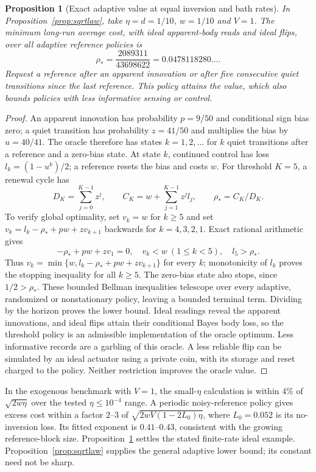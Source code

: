 \documentclass[12pt]{article}
\newtheorem{proposition}[theorem]{Proposition}
\theoremstyle{definition}
\begin{document}
\begin{proposition}[Exact adaptive value at equal inversion and bath rates]
\label{prop:adaptive_exact}
In Proposition~\ref{prop:sqrtlaw}, take $\eta=d=1/10$, $w=1/10$ and $V=1$.
The minimum long-run average cost, with ideal apparent-body reads and ideal
flips, over all adaptive reference policies is
\[
 \rho_* = \frac{2089311}{43698622}=0.0478118280\ldots.
\]
Request a reference after an apparent innovation or after five consecutive
quiet transitions since the last reference. This policy attains the value,
which also bounds policies with less informative sensing or control.
\end{proposition}
\begin{proof}
An apparent innovation has probability $p=9/50$ and conditional sign bias
zero; a quiet transition has probability $z=41/50$ and multiplies the bias
by $u=40/41$. The oracle therefore has states $k=1,2,\ldots$ for $k$ quiet
transitions after a reference and a zero-bias state. At state $k$, continued
control has loss $l_k=(1-u^k)/2$; a reference resets the bias and costs $w$.
For threshold $K=5$, a renewal cycle has
\[
 D_K=\sum_{j=0}^{K-1}z^j,\qquad
 C_K=w+\sum_{j=1}^{K-1}z^jl_j,\qquad \rho_*=C_K/D_K.
\]
To verify global optimality, set $v_k=w$ for $k\ge5$ and set
$v_k=l_k-\rho_*+pw+zv_{k+1}$ backwards for $k=4,3,2,1$.
Exact rational arithmetic gives
\[
 -\rho_*+pw+zv_1=0,\quad v_k<w\ (1\le k<5),\quad l_5>\rho_*.
\]
Thus $v_k=\min\{w,l_k-\rho_*+pw+zv_{k+1}\}$ for every $k$;
monotonicity of $l_k$ proves the stopping inequality for all $k\ge5$.
The zero-bias state also stops, since $1/2>\rho_*$. These bounded Bellman
inequalities telescope over every adaptive, randomized or nonstationary
policy, leaving a bounded terminal term. Dividing by the horizon proves
the lower bound. Ideal readings reveal the apparent innovations, and ideal
flips attain their conditional Bayes body loss, so the threshold policy is
an admissible implementation of the oracle optimum. Less informative
records are a garbling of this oracle. A less reliable flip can be
simulated by an ideal actuator using a private coin, with its storage
and reset charged to the policy. Neither restriction improves the
oracle value.
\end{proof}

In the exogenous benchmark with $V=1$, the small-$\eta$ calculation is within $4\%$ of $\sqrt{2w\eta}$ over the tested $\eta\le10^{-4}$ range. A periodic noisy-reference policy gives excess cost within a factor $2$--$3$ of $\sqrt{2wV(1-2L_0)\eta}$, where $L_0=0.052$ is its no-inversion loss. Its fitted exponent is $0.41$--$0.43$, consistent with the growing reference-block size. Proposition~\ref{prop:adaptive_exact} settles the stated finite-rate ideal example. Proposition~\ref{prop:sqrtlaw} supplies the general adaptive lower bound; its constant need not be sharp.
\end{document}
